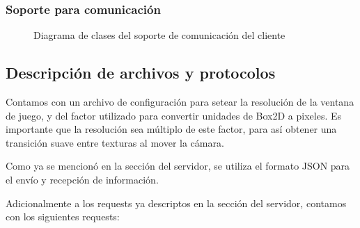 \documentclass[a4paper]{article}
\begin{document}
\subsubsection{Soporte para comunicación}

\begin{figure}[!h]
	\caption{Diagrama de clases del soporte de comunicación del cliente}
	\label{fig:diagram6}
\end{figure}

\subsection{Descripción de archivos y protocolos}

Contamos con un archivo de configuración para setear la resolución de la ventana de juego, y del factor utilizado para convertir unidades de Box2D a pixeles. Es importante que la resolución sea múltiplo de este factor, para así obtener una transición suave entre texturas al mover la cámara.

Como ya se mencionó en la sección del servidor, se utiliza el formato JSON para el envío y recepción de información.

Adicionalmente a los requests ya descriptos en la sección del servidor, contamos con los siguientes requests:
\end{document}
